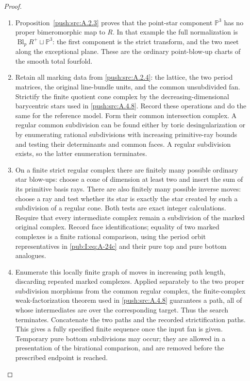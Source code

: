 \begin{proof}
\begin{enumerate}[label=\arabic*.,leftmargin=*]
\item Proposition~\ref{push:src:A.2.3} proves that the point-star component $\mathbb P^3$ has no proper bimeromorphic map to $R$. In that example the full normalization is $\operatorname{Bl}_pR^+\sqcup\mathbb P^3$: the first component is the strict transform, and the two meet along the exceptional plane. These are the ordinary point-blow-up charts of the smooth total fourfold.

\item Retain all marking
data from \ref{push:src:A.2.4}: the lattice, the two period matrices,
the original line-bundle units, and the common
unsubdivided fan. Strictify the finite quotient cone
complex by the decreasing-dimensional barycentric
stars used in \ref{push:src:A.4.8}. Record these operations and do
the same for the reference model. Form their common
intersection complex. A regular common subdivision
can be found either by toric desingularization or by
enumerating rational subdivisions with increasing
primitive-ray bounds and testing their determinants
and common faces. A regular subdivision exists, so
the latter enumeration terminates.

\item On a finite strict regular complex there are finitely
many possible ordinary star blow-ups: choose a cone
of dimension at least two and insert the sum of its
primitive basis rays. There are also finitely many
possible inverse moves: choose a ray and test whether
its star is exactly the star created by such a
subdivision of a regular cone. Both tests are exact
integer calculations. Require that every intermediate
complex remain a subdivision of the marked original
complex. Record face identifications; equality of two
marked complexes is a finite rational comparison,
using the period orbit representatives in \eqref{pub:I:eq:A-24c} and
their pure top and pure bottom analogues.

\item Enumerate this locally finite graph of moves in
increasing path length, discarding repeated marked
complexes. Applied separately to the two proper
subdivision morphisms from the common regular
complex, the finite-complex weak-factorization theorem
used in \ref{push:src:A.4.8} guarantees a path, all of whose
intermediates are over the corresponding target.
Thus the search terminates. Concatenate the two paths
and the recorded strictification paths. This gives a
fully specified finite sequence once the input fan is
given. Temporary pure bottom subdivisions may occur;
they are allowed in a presentation of the birational
comparison, and are removed before the prescribed
endpoint is reached.


\end{enumerate}
\end{proof}
